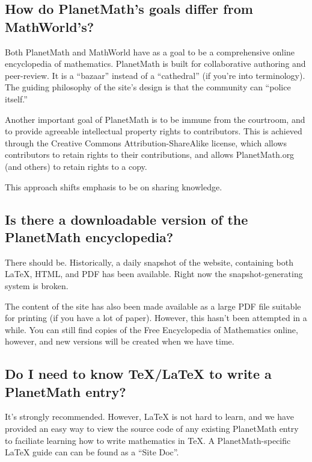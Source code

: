 \subsection{How do PlanetMath's goals differ from MathWorld's?}
Both PlanetMath and MathWorld have as a goal to be a comprehensive online encyclopedia of mathematics.  PlanetMath is built for collaborative authoring and peer-review.  It is a ``bazaar'' instead of a ``cathedral'' (if you're into  terminology).  The guiding philosophy of the site's design is that the community can ``police itself.''

Another important goal of PlanetMath is to be immune from the courtroom, and to provide agreeable intellectual property rights to contributors.  This is achieved through the Creative Commons Attribution-ShareAlike license, which allows contributors to retain rights to their contributions, and allows PlanetMath.org (and others) to retain rights to a copy.

This approach shifts emphasis to be on sharing knowledge.

\subsection{Is there a downloadable version of the PlanetMath encyclopedia?}
There should be.  Historically, a daily snapshot of the website, containing both LaTeX, HTML, and PDF has been available.   Right now the snapshot-generating system is broken.

The content of the site has also been made available as a large PDF file suitable for printing (if you have a lot of paper).  However, this hasn't been attempted in a while.  You can still find copies of the Free Encyclopedia of Mathematics online, however, and new versions will be created when we have time.

\subsection{Do I need to know \TeX/\LaTeX{} to write a PlanetMath entry?}
It's strongly recommended. However, \LaTeX{} is not hard to learn, and we have 
provided an easy way to view the source code of any existing PlanetMath entry
to faciliate learning how to write mathematics in \TeX .  A PlanetMath-specific \LaTeX{} guide can can be found as a ``Site Doc''.

